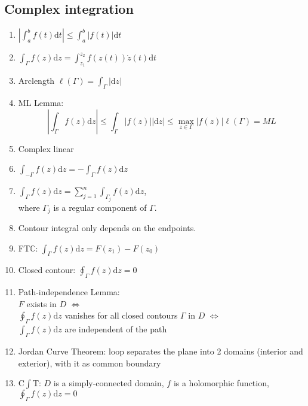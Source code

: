 \documentclass[11pt,a4paper]{article}
\begin{document}
\begin{multicols}{2}
\section*{Complex integration}
\begin{enumerate}[resume]
\item $\left| \int_a^b f(t) \mathrm{d}t \right| \leq \int_a^b |f(t)| \mathrm{d}t$

\item $\int_{\Gamma} f(z) \mathrm{d}z = \int_{z_1}^{z_2} f(z(t)) \dot{z}(t) \mathrm{d}t$

\item Arclength $\ell (\Gamma)= \int_{\Gamma} |\mathrm{d}z|$

\item ML Lemma: $$\left| \int_{\Gamma} f(z) \mathrm{d}z \right| \leq \int_{\Gamma} |f(z)| |\mathrm{d}z| \leq \max_{z \in \Gamma} |f(z)| \ell (\Gamma) = ML$$

\item Complex linear

\item $\int_{-\Gamma} f(z) \mathrm{d}z = - \int_{\Gamma} f(z) \mathrm{d}z$

\item $\displaystyle \int_{\Gamma} f(z) \mathrm{d}z = \sum_{j=1}^n \int_{\Gamma_j} f(z) \mathrm{d}z$, \\where $\Gamma_j$ is a regular component of $\Gamma$. 

\item Contour integral only depends on the endpoints. 

\item FT$\mathbb{C}$: $\int_{\Gamma} f(z) \mathrm{d}z = F(z_1) - F(z_0)$

\item Closed contour: $\oint_{\Gamma} f(z) \mathrm{d}z = 0$

\item Path-independence Lemma: \\$F$ exists in $D$ $\Leftrightarrow$ \\$\oint_{\Gamma} f(z) \mathrm{d}z$ vanishes for all closed contours $\Gamma$ in $D$ $\Leftrightarrow$ \\$\int_{\Gamma} f(z) \mathrm{d}z$ are independent of the path

\item Jordan Curve Theorem: loop separates the plane into 2 domains (interior and exterior), with it as common boundary

\item C$\int$T: $D$ is a simply-connected domain, $f$ is a holomorphic function, $\oint_{\Gamma} f(z) \mathrm{d}z = 0$


\end{enumerate}
\end{multicols}
\end{document}
